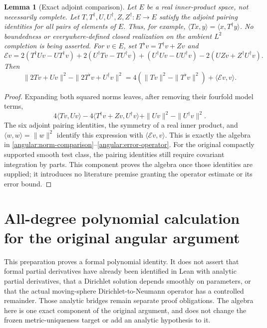 \documentclass[11pt]{article}
\newtheorem{lemma}[theorem]{Lemma}
\theoremstyle{definition}
\theoremstyle{remark}
\numberwithin{equation}{section}
\begin{document}
\begin{lemma}[Exact adjoint comparison]\label{formal-components:commutator}
Let $E$ be a real inner-product space, not necessarily complete. Let
$T,T^\dagger,U,U^\dagger,Z,Z^\dagger:E\to E$ satisfy the adjoint pairing
identities for all pairs of elements of $E$. Thus, for example,
$\langle Tx,y\rangle=\langle x,T^\dagger y\rangle$.
No boundedness or everywhere-defined closed realization on the ambient
$L^2$ completion is being asserted. For $v\in E$, set
$T^\flat v=T^\dagger v+Zv$ and
\[
 \mathcal Ev=2(T^\dagger Uv-UT^\dagger v)
       +2(U^\dagger Tv-TU^\dagger v)
       +(U^\dagger Uv-UU^\dagger v)
       -2(UZv+Z^\dagger U^\dagger v).
\]
Then
\[
 \|2Tv+Uv\|^2-\|2T^\flat v+U^\dagger v\|^2
 =4(\|Tv\|^2-\|T^\flat v\|^2)+\langle\mathcal Ev,v\rangle.
\]
\end{lemma}
\begin{proof}
Expanding both squared norms leaves, after removing their fourfold model
terms,
\[
 4\langle Tv,Uv\rangle-4\langle T^\dagger v+Zv,U^\dagger v\rangle
       +\|Uv\|^2-\|U^\dagger v\|^2.
\]
The six adjoint pairing identities, the symmetry of a real inner product,
and $\langle w,w\rangle=\|w\|^2$ identify this expression with
$\langle\mathcal Ev,v\rangle$. This is exactly the algebra in
\eqref{angular:norm-comparison}--\eqref{angular:error-operator}.
For the original compactly supported smooth test class, the pairing
identities still require covariant integration by parts. This component
proves the algebra once those identities are supplied; it introduces no
literature premise granting the operator estimate or its error bound.
\end{proof}

\clearpage


\section*{All-degree polynomial calculation for the original angular argument}

This preparation proves a formal polynomial identity.  It does not assert
that formal partial derivatives have already been identified in Lean with
analytic partial derivatives, that a Dirichlet solution depends smoothly
on parameters, or that the actual moving-sphere Dirichlet-to-Neumann
operator has a controlled remainder.  Those analytic bridges remain
separate proof obligations.  The algebra here is one exact component of
the original argument, and does not change the frozen metric-uniqueness
target or add an analytic hypothesis to it.
\end{document}
